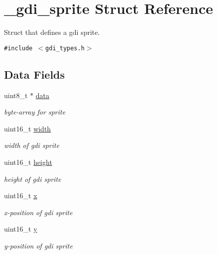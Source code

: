 \hypertarget{struct__gdi__sprite}{
\section{\_\-gdi\_\-sprite Struct Reference}
\label{struct__gdi__sprite}
}
Struct that defines a gdi sprite.  


{\tt \#include $<$gdi\_\-types.h$>$}

\subsection*{Data Fields}
\begin{CompactItemize}
\item 
uint8\_\-t $\ast$ \hyperlink{struct__gdi__sprite_a6abd9b710c9d6511bdd300879274a43}{data}
\begin{CompactList}\small\item\em byte-array for sprite \item\end{CompactList}\item 
\hypertarget{struct__gdi__sprite_b738f530b78ea1a6f33a056a58bb7dad}{
uint16\_\-t \hyperlink{struct__gdi__sprite_b738f530b78ea1a6f33a056a58bb7dad}{width}}
\label{struct__gdi__sprite_b738f530b78ea1a6f33a056a58bb7dad}

\begin{CompactList}\small\item\em width of gdi sprite \item\end{CompactList}\item 
\hypertarget{struct__gdi__sprite_a82fdefeaae78f1cc563eb47537dcca4}{
uint16\_\-t \hyperlink{struct__gdi__sprite_a82fdefeaae78f1cc563eb47537dcca4}{height}}
\label{struct__gdi__sprite_a82fdefeaae78f1cc563eb47537dcca4}

\begin{CompactList}\small\item\em height of gdi sprite \item\end{CompactList}\item 
\hypertarget{struct__gdi__sprite_334545a06208d99f412c5fac76ded57e}{
uint16\_\-t \hyperlink{struct__gdi__sprite_334545a06208d99f412c5fac76ded57e}{x}}
\label{struct__gdi__sprite_334545a06208d99f412c5fac76ded57e}

\begin{CompactList}\small\item\em x-position of gdi sprite \item\end{CompactList}\item 
\hypertarget{struct__gdi__sprite_7b4cbe17d05009d34503a3ee126c7117}{
uint16\_\-t \hyperlink{struct__gdi__sprite_7b4cbe17d05009d34503a3ee126c7117}{y}}
\label{struct__gdi__sprite_7b4cbe17d05009d34503a3ee126c7117}

\begin{CompactList}\small\item\em y-position of gdi sprite \item\end{CompactList}\end{CompactItemize}


